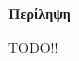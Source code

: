 \begin{center}
\centering

\vspace{0.5cm}
\centering
\textbf{\Large{Περίληψη}}
{}

\vspace{1cm}

\end{center}
TODO!!
